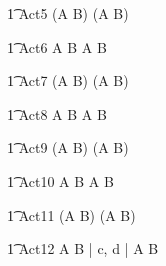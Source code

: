 \begin{circusaction}
        \t1 Act5 \circdef (A \circtimedinterrupt {} \rcirctime B) \extchoice (A \circtimedinterrupt {} \rcirctime B) \\
\end{circusaction}

\begin{circusaction}
	\t1 Act6 \circdef A \circtimedinterrupt {} \rcirctime B \intchoice A \circtimedinterrupt {} \rcirctime B \\
\end{circusaction}

\begin{circusaction}
        \t1 Act7 \circdef (A \circtimedinterrupt {} \rcirctime B) \intchoice (A \circtimedinterrupt {} \rcirctime B) \\
\end{circusaction}

\begin{circusaction}
	\t1 Act8 \circdef A \circtimedinterrupt {} \rcirctime B \interleave A \circtimedinterrupt {} \rcirctime B \\
\end{circusaction}

\begin{circusaction}
        \t1 Act9 \circdef (A \circtimedinterrupt {} \rcirctime B) \interleave (A \circtimedinterrupt {} \rcirctime B) \\
\end{circusaction}

\begin{circusaction}
        \t1 Act10 \circdef A \circtimedinterrupt {} \rcirctime B \circinterrupt  A \circtimedinterrupt {} \rcirctime B \\
\end{circusaction}

\begin{circusaction}
        \t1 Act11 \circdef (A \circtimedinterrupt {} \rcirctime B) \circinterrupt (A \circtimedinterrupt {} \rcirctime B) \\
\end{circusaction}



\begin{circusaction}
        \t1 Act12 \circdef A \circtimedinterrupt {} \rcirctime B \lpar | \lchanset c, d \rchanset | \rpar  A \circtimedinterrupt {} \rcirctime B \\
\end{circusaction}

